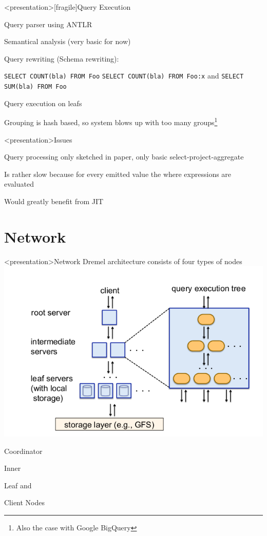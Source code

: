 \begin{frame}<presentation>[fragile]{Query Execution}
\begin{niitemize}
 \item Query parser using ANTLR
 \item Semantical analysis (very basic for now)
 \item Query rewriting (Schema rewriting):
   \begin{niitemize}
     \item \verb#SELECT COUNT(bla) FROM Foo# \ra{} \verb#SELECT COUNT(bla) FROM Foo:x# and
       \verb#SELECT SUM(bla) FROM Foo#
   \end{niitemize}
 \item Query execution on leafs
 \item Grouping is hash based, so system blows up with too many groups\footnote{Also the case with Google BigQuery}
\end{niitemize}
\end{frame}

\begin{frame}<presentation>{Issues}
\begin{niitemize}
 \item Query processing only sketched in paper, only basic
  select-project-aggregate
 \item Is rather slow because for every emitted value the where expressions
  are evaluated
 \item Would greatly benefit from JIT
\end{niitemize}
\end{frame}

\section{Network}
\begin{frame}<presentation>{Network}
  Dremel architecture consists of four types of nodes
  \includegraphics[width=.55\textwidth]{gfx/net-arch}
  \begin{niitemize}
    \item Coordinator
    \item Inner
    \item Leaf and
    \item Client Nodes
  \end{niitemize}
\end{frame}


